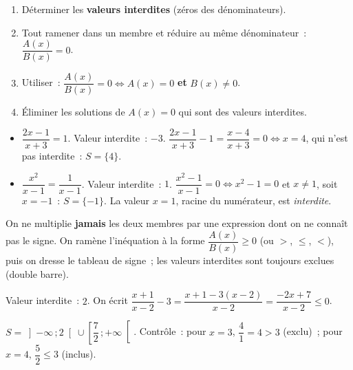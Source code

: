\begin{methode}
\begin{enumerate}
  \item D\'eterminer les \textbf{valeurs interdites} (z\'eros des d\'enominateurs).
  \item Tout ramener dans un membre et r\'eduire au m\^eme d\'enominateur~:
        $\dfrac{A(x)}{B(x)}=0$.
  \item Utiliser~: $\dfrac{A(x)}{B(x)}=0 \Leftrightarrow A(x)=0$ \textbf{et} $B(x)\ne0$.
  \item \'Eliminer les solutions de $A(x)=0$ qui sont des valeurs interdites.
\end{enumerate}
\end{methode}

\begin{ex}
\begin{itemize}
  \item $\dfrac{2x-1}{x+3}=1$. Valeur interdite~: $-3$.
        $\dfrac{2x-1}{x+3}-1=\dfrac{x-4}{x+3}=0\Leftrightarrow x=4$, qui n'est pas interdite~: $S=\{4\}$.
  \item $\dfrac{x^2}{x-1}=\dfrac{1}{x-1}$. Valeur interdite~: $1$.
        $\dfrac{x^2-1}{x-1}=0\Leftrightarrow x^2-1=0$ et $x\ne1$, soit $x=-1$~: $S=\{-1\}$.
        La valeur $x=1$, racine du num\'erateur, est \emph{interdite}.
\end{itemize}
\end{ex}

\begin{methode}
On ne multiplie \textbf{jamais} les deux membres par une expression dont on ne
conna\^it pas le signe. On ram\`ene l'in\'equation \`a la forme
$\dfrac{A(x)}{B(x)}\geq0$ (ou $>$, $\leq$, $<$), puis on dresse le tableau de signe~;
les valeurs interdites sont toujours exclues (double barre).
\end{methode}

\begin{ex}
Valeur interdite~: $2$. On \'ecrit
$\dfrac{x+1}{x-2}-3=\dfrac{x+1-3(x-2)}{x-2}=\dfrac{-2x+7}{x-2}\leq0$.
\begin{center}
\end{center}
$S=\left]-\infty\,;2\right[\cup\left[\dfrac72\,;+\infty\right[$.
Contr\^ole~: pour $x=3$, $\dfrac{4}{1}=4>3$ (exclu)~; pour $x=4$, $\dfrac52\leq3$ (inclus).
\end{ex}


